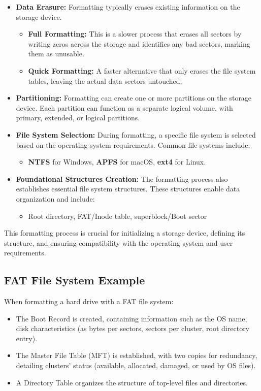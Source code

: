 \begin{itemize}
    \item \textbf{Data Erasure:} Formatting typically erases existing information on the storage device. 
    \begin{itemize}
        \item \textbf{Full Formatting:} This is a slower process that erases all sectors by writing zeros across the storage and identifies any bad sectors, marking them as unusable.
        \item \textbf{Quick Formatting:} A faster alternative that only erases the file system tables, leaving the actual data sectors untouched.
    \end{itemize}
    \item \textbf{Partitioning:} Formatting can create one or more partitions on the storage device. Each partition can function as a separate logical volume, with primary, extended, or logical partitions.
    \item \textbf{File System Selection:} During formatting, a specific file system is selected based on the operating system requirements. Common file systems include:
    \begin{itemize}
        \item \textbf{NTFS} for Windows, \textbf{APFS} for macOS, \textbf{ext4} for Linux.
    \end{itemize}
    \item \textbf{Foundational Structures Creation:} The formatting process also establishes essential file system structures. These structures enable data organization and include:
    \begin{itemize}
        \item Root directory, FAT/Inode table, superblock/Boot sector
    \end{itemize}
\end{itemize}

This formatting process is crucial for initializing a storage device, defining its structure, and ensuring compatibility with the operating system and user requirements.


\subsection{FAT File System Example}

When formatting a hard drive with a FAT file system:
\begin{itemize}
    \item The Boot Record is created, containing information such as the OS name, disk characteristics (as bytes per sectors, sectors per cluster, root directory entry).
    \item The Master File Table (MFT) is established, with two copies for redundancy, detailing clusters' status (available, allocated, damaged, or used by OS files).
    \item A Directory Table organizes the structure of top-level files and directories.
\end{itemize}

